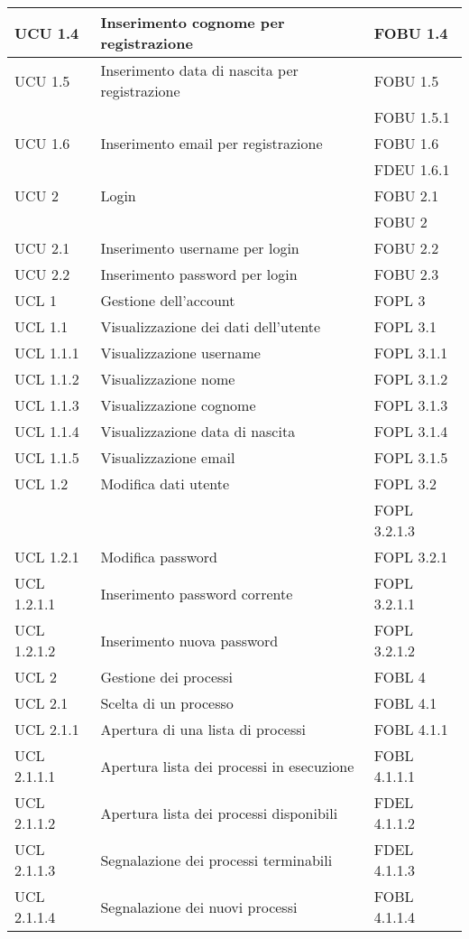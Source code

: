\begin{longtable}{lXp{}}
\midrule 
UCU 1.4&Inserimento cognome per registrazione&FOBU 1.4\\ 
\midrule 
UCU 1.5&Inserimento data di nascita per registrazione&FOBU 1.5\\ 
&&FOBU 1.5.1\\ 
\midrule 
UCU 1.6&Inserimento email per registrazione&FOBU 1.6\\ 
&&FDEU 1.6.1\\ 
\midrule 
UCU 2&Login&FOBU 2.1\\ 
&&FOBU 2\\ 
\midrule 
UCU 2.1&Inserimento username per login&FOBU 2.2\\ 
\midrule 
UCU 2.2&Inserimento password per login&FOBU 2.3\\ 
\midrule 
UCL 1&Gestione dell'account&FOPL 3\\ 
\midrule 
UCL 1.1&Visualizzazione dei dati dell'utente&FOPL 3.1\\ 
\midrule 
UCL 1.1.1&Visualizzazione username&FOPL 3.1.1\\ 
\midrule 
UCL 1.1.2&Visualizzazione nome&FOPL 3.1.2\\ 
\midrule 
UCL 1.1.3&Visualizzazione cognome&FOPL 3.1.3\\ 
\midrule 
UCL 1.1.4&Visualizzazione data di nascita&FOPL 3.1.4\\ 
\midrule
UCL 1.1.5&Visualizzazione email&FOPL 3.1.5\\ 
\midrule
UCL 1.2&Modifica dati utente&FOPL 3.2\\ 
&&FOPL 3.2.1.3\\
\midrule 
UCL 1.2.1&Modifica password&FOPL 3.2.1\\ 
\midrule 
UCL 1.2.1.1&Inserimento password corrente&FOPL 3.2.1.1\\ 
\midrule 
UCL 1.2.1.2&Inserimento nuova password&FOPL 3.2.1.2\\ 
\midrule 
UCL 2&Gestione dei processi&FOBL 4\\ 
\midrule 
UCL 2.1&Scelta di un processo&FOBL 4.1\\
\midrule
UCL 2.1.1&Apertura di una lista di processi&FOBL 4.1.1\\ 
\midrule 
UCL 2.1.1.1&Apertura lista dei processi in esecuzione&FOBL 4.1.1.1\\ 
\midrule 
UCL 2.1.1.2&Apertura lista dei processi disponibili&FDEL 4.1.1.2\\ 
\midrule 
UCL 2.1.1.3&Segnalazione dei processi terminabili&FDEL 4.1.1.3\\ 
\midrule 
UCL 2.1.1.4&Segnalazione dei nuovi processi&FOBL 4.1.1.4\\ 

\end{longtable}
